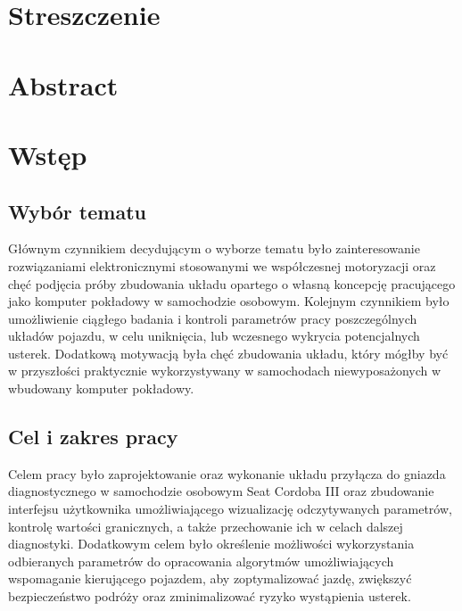 \documentclass[12pt]{article} %
\numberwithin{equation}{subsection}
\numberwithin{figure}{section}
\numberwithin{table}{section}
\begin{document}
\newpage
\thispagestyle{empty}
\section*{Streszczenie}
\vspace{0.5cm}
\hspace{0.5cm}
\newpage

\section*{Abstract}
\thispagestyle{empty}
\vspace{0.5cm}
\hspace{0.5cm}

\newpage

\section{Wstęp}

	\subsection{Wybór tematu}
		\hspace{0.5cm}Głównym czynnikiem decydującym o wyborze tematu było zainteresowanie rozwiązaniami elektronicznymi stosowanymi we współczesnej motoryzacji oraz chęć podjęcia próby zbudowania układu opartego o własną koncepcję pracującego jako komputer pokładowy w samochodzie osobowym. Kolejnym czynnikiem było umożliwienie ciągłego badania i kontroli parametrów pracy poszczególnych układów pojazdu, w celu uniknięcia, lub wczesnego wykrycia potencjalnych usterek. Dodatkową motywacją była chęć zbudowania układu, który mógłby być w przyszłości praktycznie wykorzystywany w samochodach niewyposażonych w wbudowany komputer pokładowy. 	
	
	\subsection{Cel i zakres pracy}
		\hspace{0.5cm}Celem pracy było zaprojektowanie oraz wykonanie układu przyłącza do gniazda diagnostycznego w samochodzie osobowym Seat Cordoba III oraz zbudowanie interfejsu użytkownika umożliwiającego wizualizację odczytywanych parametrów, kontrolę wartości granicznych, a także przechowanie ich w celach dalszej diagnostyki. Dodatkowym celem było określenie możliwości wykorzystania odbieranych parametrów do opracowania algorytmów umożliwiających wspomaganie kierującego pojazdem, aby zoptymalizować jazdę, zwiększyć bezpieczeństwo podróży oraz zminimalizować ryzyko wystąpienia usterek. 
	
\end{document}
